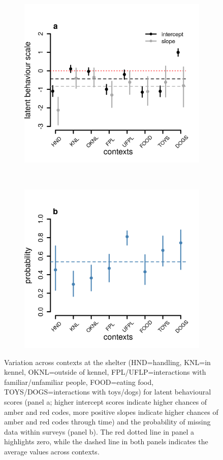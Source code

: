 \documentclass[12pt]{article}
\begin{document}
\newpage
\begin{figure}[]
  \centering
  \begin{subfigure}{0.5\textwidth}
    \includegraphics[scale=0.6]{figures/figure_S1_a}
  \end{subfigure}%
  ~
  \begin{subfigure}{0.5\textwidth}
    \includegraphics[scale=0.6]{figures/figure_S1_b}
  \end{subfigure}%
\caption{Variation across contexts at the shelter  (HND=handling, KNL=in kennel, OKNL=outside of kennel, FPL/UFLP=interactions with familiar/unfamiliar people, FOOD=eating food, TOYS/DOGS=interactions with toys/dogs) for latent behavioural scores (panel a; higher intercept scores indicate higher chances of amber and red codes, more positive slopes indicate higher chances of amber and red codes through time) and the probability of missing data within surveys (panel b). The red dotted line in panel a highlights zero, while the dashed line in both panels indicates the average values across contexts.
}
\label{fig_1}
\end{figure}
\end{document}
